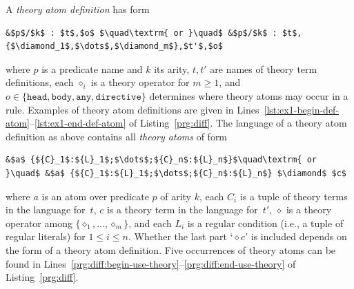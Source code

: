 \documentclass[a4paper,USenglish]{oasics-v2016}
\begin{document}
A \emph{theory atom definition} has form
\begin{lstlisting}[numbers=none,mathescape=t]
&$p$/$k$ : $t$,$o$ $\quad\textrm{ or }\quad$ &$p$/$k$ : $t$,{$\diamond_1$,$\dots$,$\diamond_m$},$t'$,$o$
\end{lstlisting}
where $p$ is a predicate name and $k$ its arity,
$t,t'$ are names of theory term definitions,
each $\diamond_i$ is a theory operator for $m\geq 1$,
and
\(
o\in\{\mathtt{head},\mathtt{body},\mathtt{any}, \mathtt{directive}\}
\)
determines where theory atoms may occur in a rule.
%
Examples of theory atom definitions are given in Lines~\ref{lst:ex1-begin-def-atom}--\ref{lst:ex1-end-def-atom} of Listing~\ref{prg:diff}.
%
The language of a theory atom definition as above contains all \emph{theory atoms} of form
\begin{lstlisting}[numbers=none,mathescape=t]
&$a$ {${C}_1$:${L}_1$;$\dots$;${C}_n$:${L}_n$}$\quad\textrm{ or }\quad$ &$a$ {${C}_1$:${L}_1$;$\dots$;${C}_n$:${L}_n$} $\diamond$ $c$
\end{lstlisting}
where $a$ is an atom over predicate $p$ of arity $k$,
each ${C}_i$ is a tuple of theory terms in the language for~$t$,
$c$ is a theory term in the language for~$t'$,
$\diamond$ is a theory operator among $\{ \diamond_1, \dots, \diamond_m \}$,
and each ${L}_i$ is a regular condition (i.e., a tuple of regular literals)
for $1\leq i\leq n$.
%
Whether the last part `${}\diamond c$' is included depends on the form of a theory atom definition.
%
Five occurrences of theory atoms can be found in Lines~\ref{prg:diff:begin-use-theory}--\ref{prg:diff:end-use-theory} of Listing~\ref{prg:diff}.
\end{document}
